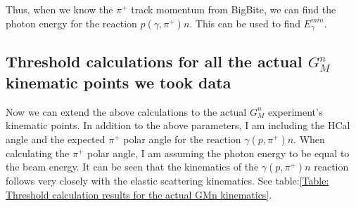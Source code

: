 Thus, when we know the $\pi^+$ track momentum from BigBite, we can find the photon energy for the reaction $p(\gamma,\pi^+)n$. This can be used to find $E^{min}_\gamma$.


\subsection{Threshold calculations for all the actual $G_M^n$ kinematic points we took data}

Now we can extend the above calculations to the actual $G_M^n$ experiment's kinematic points. In addition to the above parameters, I am including the HCal angle and the expected $\pi^+$ polar angle for the reaction $\gamma(p,\pi^+)n$. When calculating the $\pi^+$ polar angle, I am assuming the photon energy to be equal to the beam energy. It can be seen that the kinematics of the $\gamma(p,\pi^+)n$ reaction follows very closely with the elastic scattering kinematics. See table:\ref{Table: Threshold calculation results for the actual GMn kinematics}.

